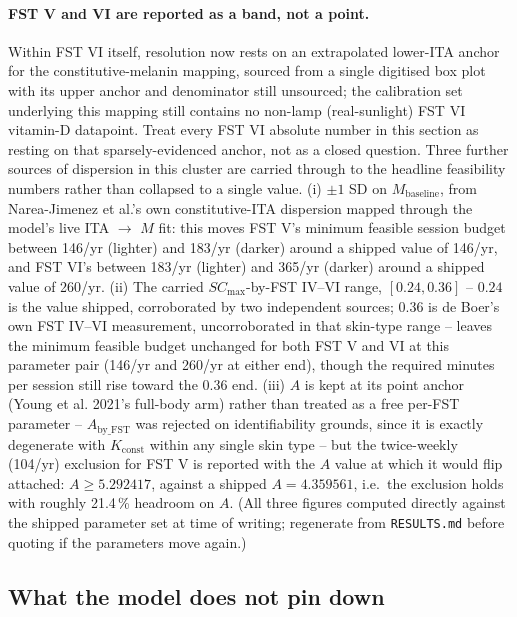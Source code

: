 \documentclass[11pt]{article}
\begin{document}
\paragraph{FST V and VI are reported as a band, not a point.} Within
FST VI itself, resolution now rests on an extrapolated lower-ITA
anchor for the constitutive-melanin mapping, sourced from a single
digitised box plot with its upper anchor and denominator still
unsourced; the calibration set underlying this mapping still contains
no non-lamp (real-sunlight) FST VI vitamin-D datapoint. Treat every
FST VI absolute number in this section as resting on that
sparsely-evidenced anchor, not as a closed question. Three further
sources of dispersion in this cluster are carried through to the
headline feasibility numbers rather than collapsed to a single value.
(i) $\pm 1$ SD on $M_{\mathrm{baseline}}$, from Narea-Jimenez et
al.'s own constitutive-ITA dispersion mapped through the model's
live ITA $\to$ $M$ fit: this moves FST V's minimum feasible session
budget between 146/yr (lighter) and 183/yr (darker) around a shipped
value of 146/yr, and FST VI's between 183/yr (lighter) and 365/yr
(darker) around a shipped value of 260/yr. (ii) The carried
$SC_{\max}$-by-FST IV--VI range, $[0.24, 0.36]$ --
$0.24$ is the value shipped, corroborated by two independent sources;
$0.36$ is de Boer's own FST IV--VI measurement, uncorroborated in
that skin-type range -- leaves the minimum feasible budget unchanged
for both FST V and VI at this parameter pair (146/yr and 260/yr at
either end), though the required minutes per session still rise
toward the $0.36$ end. (iii) $A$ is kept at its point anchor (Young
et al. 2021's full-body arm) rather than treated as a free per-FST
parameter -- $A_{\mathrm{by\_FST}}$ was rejected on identifiability
grounds, since it is exactly degenerate with $K_{\mathrm{const}}$
within any single skin type -- but the twice-weekly (104/yr)
exclusion for FST V is reported with the $A$ value at which it would
flip attached: $A \geq 5.292417$, against a shipped $A = 4.359561$,
i.e.\ the exclusion holds with roughly 21.4\,\% headroom on $A$.
(All three figures computed directly against the shipped parameter
set at time of writing; regenerate from \texttt{RESULTS.md} before
quoting if the parameters move again.)

\subsection{What the model does not pin down}
\end{document}
